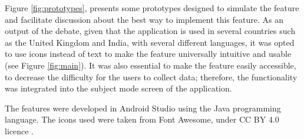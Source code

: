 Figure \ref{fig:prototypes}, presents some prototypes designed to simulate the feature and facilitate discussion about the best way to implement this feature. As an output of the debate, given that the application is used in several countries such as the United Kingdom and India, with several different languages, it was opted to use icons instead of text to make the feature universally intuitive and usable (see Figure \ref{fig:main}). It was also essential to make the feature easily accessible, to decrease the difficulty for the users to collect data; therefore, the functionality was integrated into the subject mode screen of the application.

The features were developed in Android Studio using the Java programming language. The icons used were taken from Font Awesome, under CC BY 4.0 licence \cite{fontawesome}. 

